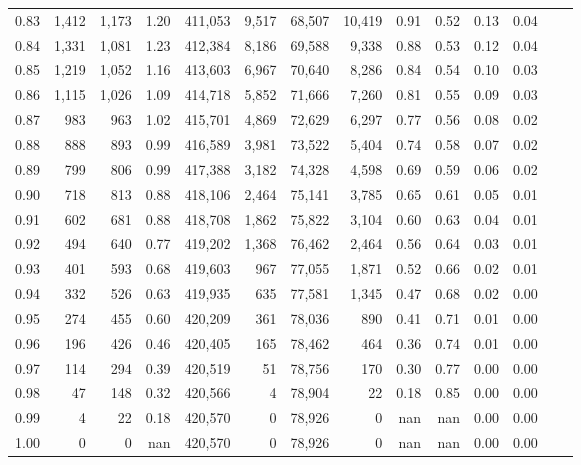 \begin{tabular}{rrrrrrrrrrrrrr}
0.83 &  1,412 &  1,173 &    1.20 &  411,053 &    9,517 &  68,507 &  10,419 &  0.91 &  0.52 &  0.13 &      0.04 \\
0.84 &  1,331 &  1,081 &    1.23 &  412,384 &    8,186 &  69,588 &   9,338 &  0.88 &  0.53 &  0.12 &      0.04 \\
0.85 &  1,219 &  1,052 &    1.16 &  413,603 &    6,967 &  70,640 &   8,286 &  0.84 &  0.54 &  0.10 &      0.03 \\
0.86 &  1,115 &  1,026 &    1.09 &  414,718 &    5,852 &  71,666 &   7,260 &  0.81 &  0.55 &  0.09 &      0.03 \\
0.87 &    983 &    963 &    1.02 &  415,701 &    4,869 &  72,629 &   6,297 &  0.77 &  0.56 &  0.08 &      0.02 \\
0.88 &    888 &    893 &    0.99 &  416,589 &    3,981 &  73,522 &   5,404 &  0.74 &  0.58 &  0.07 &      0.02 \\
0.89 &    799 &    806 &    0.99 &  417,388 &    3,182 &  74,328 &   4,598 &  0.69 &  0.59 &  0.06 &      0.02 \\
0.90 &    718 &    813 &    0.88 &  418,106 &    2,464 &  75,141 &   3,785 &  0.65 &  0.61 &  0.05 &      0.01 \\
0.91 &    602 &    681 &    0.88 &  418,708 &    1,862 &  75,822 &   3,104 &  0.60 &  0.63 &  0.04 &      0.01 \\
0.92 &    494 &    640 &    0.77 &  419,202 &    1,368 &  76,462 &   2,464 &  0.56 &  0.64 &  0.03 &      0.01 \\
0.93 &    401 &    593 &    0.68 &  419,603 &      967 &  77,055 &   1,871 &  0.52 &  0.66 &  0.02 &      0.01 \\
0.94 &    332 &    526 &    0.63 &  419,935 &      635 &  77,581 &   1,345 &  0.47 &  0.68 &  0.02 &      0.00 \\
0.95 &    274 &    455 &    0.60 &  420,209 &      361 &  78,036 &     890 &  0.41 &  0.71 &  0.01 &      0.00 \\
0.96 &    196 &    426 &    0.46 &  420,405 &      165 &  78,462 &     464 &  0.36 &  0.74 &  0.01 &      0.00 \\
0.97 &    114 &    294 &    0.39 &  420,519 &       51 &  78,756 &     170 &  0.30 &  0.77 &  0.00 &      0.00 \\
0.98 &     47 &    148 &    0.32 &  420,566 &        4 &  78,904 &      22 &  0.18 &  0.85 &  0.00 &      0.00 \\
0.99 &      4 &     22 &    0.18 &  420,570 &        0 &  78,926 &       0 &   nan &   nan &  0.00 &      0.00 \\
1.00 &      0 &      0 &     nan &  420,570 &        0 &  78,926 &       0 &   nan &   nan &  0.00 &      0.00 \\
\bottomrule
\end{tabular}
